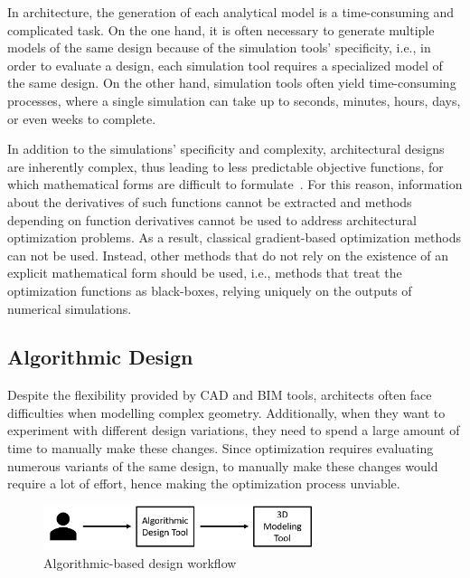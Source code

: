 	In architecture, the generation of each analytical model is a time-consuming and complicated task. On the one hand, it is often necessary to generate multiple models of the same design because of the simulation tools' specificity, i.e., in order to evaluate a design, each simulation tool requires a specialized model of the same design. On the other hand, simulation tools often yield time-consuming processes, where a single simulation can take up to seconds, minutes, hours, days, or even weeks to complete. 
	
	In addition to the simulations' specificity and complexity, architectural designs are inherently complex, thus leading to less predictable objective functions, for which mathematical forms are difficult to formulate~\cite{Machairas2014}. For this reason, information about the derivatives of such functions cannot be extracted and methods depending on function derivatives cannot be used to address architectural optimization problems. As a result, classical gradient-based optimization methods can not be used. Instead, other methods that do not rely on the existence of an explicit mathematical form should be used, i.e., methods that treat the optimization functions as black-boxes, relying uniquely on the outputs of numerical simulations.
	
\subsection{Algorithmic Design}

	Despite the flexibility provided by \ac{CAD} and \ac{BIM} tools, architects often face difficulties when modelling complex geometry. Additionally, when they want to experiment with different design variations, they need to spend a large amount of time to manually make these changes. Since optimization requires evaluating numerous variants of the same design, to manually make these changes would require a lot of effort, hence making the optimization process unviable. 

\begin{figure}[htbp]
\centering
\includegraphics[width=0.70\textwidth]{./Images/Introduction/AlgorithmicArchitecturalDesign.png}
\caption[General view of the Algorithmic Design Approach]{Algorithmic-based design workflow}
\label{fig:algorithmicdesign}
\end{figure}	
	
